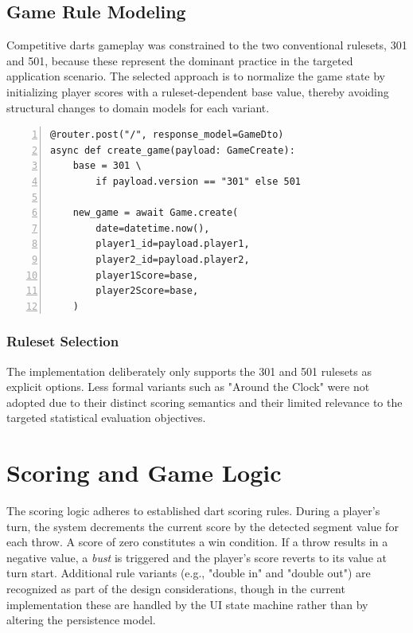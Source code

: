 \vspace{\baselineskip}

\subsection{Game Rule Modeling}
Competitive darts gameplay was constrained to the two conventional rulesets, 301 and 501, because these represent the dominant practice in the targeted application scenario. The selected approach is to normalize the game state by initializing player scores with a ruleset-dependent base value, thereby avoiding structural changes to domain models for each variant.

\begin{lstlisting}[numbers=left,caption=Game creation endpoint limiting score based on ruleset, label=lst:game_creation]
@router.post("/", response_model=GameDto)
async def create_game(payload: GameCreate):
    base = 301 \
        if payload.version == "301" else 501

    new_game = await Game.create(
        date=datetime.now(),
        player1_id=payload.player1,
        player2_id=payload.player2,
        player1Score=base,
        player2Score=base,
    )
\end{lstlisting}

\subsubsection{Ruleset Selection}
The implementation deliberately only supports the 301 and 501 rulesets as explicit options. Less formal variants such as "Around the Clock" were not adopted due to their distinct scoring semantics and their limited relevance to the targeted statistical evaluation objectives.

\section{Scoring and Game Logic}
The scoring logic adheres to established dart scoring rules. During a player's turn, the system decrements the current score by the detected segment value for each throw. A score of zero constitutes a win condition. If a throw results in a negative value, a \emph{bust} is triggered and the player's score reverts to its value at turn start. Additional rule variants (e.g., "double in" and "double out") are recognized as part of the design considerations, though in the current implementation these are handled by the UI state machine rather than by altering the persistence model.

